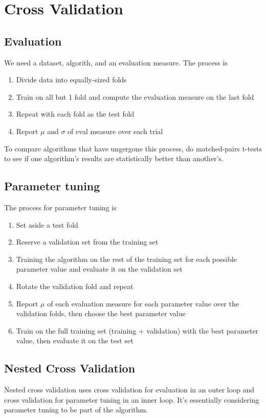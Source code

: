 \documentclass{article}
\begin{document}
\section{Cross Validation}

\subsection{Evaluation}
We need a dataset, algorith, and an evaluation measure. The process is
\begin{enumerate}
	\item Divide data into equally-sized folds
	\item Train on all but 1 fold and compute the evaluation measure on the last fold
	\item Repeat with each fold as the test fold
	\item Report $\mu$ and $\sigma$ of eval measure over each trial
\end{enumerate}
To compare algorithms that have ungergone this process, do matched-pairs t-tests to see if one algorithm's results are statistically better than another's.

\subsection{Parameter tuning}
The process for parameter tuning is
\begin{enumerate}
	\item Set aside a test fold
	\item Reserve a validation set from the training set
	\item Training the algorithm on the rest of the training set for each possible parameter value and evaluate it on the validation set
	\item Rotate the validation fold and repeat
	\item Report $\mu$ of each evaluation measure for each parameter value over the validation folds, then choose the best parameter value
	\item Train on the full training set (training + validation) with the best parameter value, then evaluate it on the test set
\end{enumerate}

\subsection{Nested Cross Validation}
Nested cross validation uses cross validation for evaluation in an outer loop and cross validation for parameter tuning in an inner loop. It's essentially considering parameter tuning to be part of the algorithm.
\end{document}
